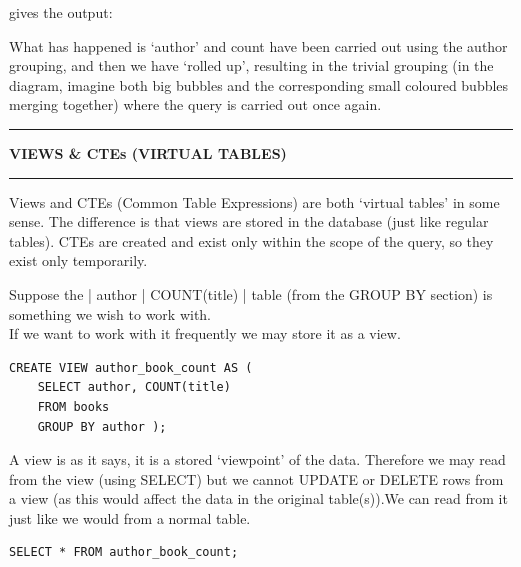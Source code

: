 \documentclass[8pt]{extarticle}
\newcommand{\heading}[1]{%
    \noindent
    \rule{\linewidth}{0.4pt}
    \begin{center}
        \vspace{-1ex}
        \textbf{#1}        
        \vspace{-2.5ex}
    \end{center}
    \rule{\linewidth}{0.4pt}
}
\begin{document}
\begin{multicols}{4}
gives the output: 
\begin{center}
\end{center}
\vspace*{0.25ex}

What has happened is `author' and count have been carried out using the author grouping, and then we have `rolled up', resulting in the trivial grouping (in the diagram, imagine both big bubbles and the corresponding small coloured bubbles merging together) where the query is carried out once again.

\vspace{1ex} 
\heading{VIEWS \& CTEs (VIRTUAL TABLES)}

Views and CTEs (Common Table Expressions) are both `virtual tables' in some sense. The difference is that views are stored in the database (just like regular tables). CTEs are created and exist only within the scope of the query, so they exist only temporarily.

Suppose the | author | COUNT(title) | table (from the GROUP BY section) is something we wish to work with.\\

If we want to work with it frequently we may store it as a view. 


\vspace{0.5ex}
\begin{lstlisting}[style=sql]
CREATE VIEW author_book_count AS (
    SELECT author, COUNT(title)
    FROM books
    GROUP BY author );
\end{lstlisting}
\vspace{0.5ex}

A view is as it says, it is a stored `viewpoint' of the data. Therefore we may read from the view (using SELECT) but we cannot UPDATE or DELETE rows from a view (as this would affect the data in the original table(s)).We can read from it just like we would from a normal table. 

\vspace{0.5ex}
\begin{lstlisting}[style=sql]
SELECT * FROM author_book_count;
\end{lstlisting}
\vspace{0.5ex}


\end{multicols}
\end{document}
